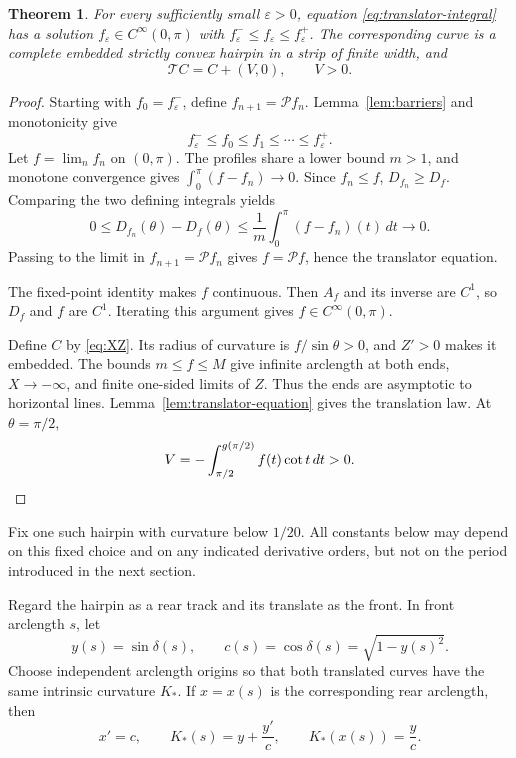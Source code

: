 \documentclass[11pt]{article}
\numberwithin{equation}{section}
\newtheorem{theorem}{Theorem}[section]
\newcommand{\Tmap}{\mathcal T}
\newcommand{\eps}{\varepsilon}
\begin{document}
\begin{theorem}\label{thm:hairpin}
For every sufficiently small \(\eps>0\), equation
\eqref{eq:translator-integral} has a solution \(f_\eps\in C^\infty(0,\pi)\)
with \(f_\eps^-\leq f_\eps\leq f_\eps^+\). The corresponding curve is a
complete embedded strictly convex hairpin in a strip of finite width, and
\[
  \Tmap C=C+(V,0),\qquad V>0.
\]
\end{theorem}

\begin{proof}
Starting with \(f_0=f_\eps^-\), define \(f_{n+1}=\mathcal P f_n\).
Lemma~\ref{lem:barriers} and monotonicity give
\[
  f_\eps^-\leq f_0\leq f_1\leq\cdots\leq f_\eps^+.
\]
Let \(f=\lim_n f_n\) on \((0,\pi)\). The profiles share a lower bound
\(m>1\), and monotone convergence gives
\(\int_0^\pi(f-f_n)\to0\). Since \(f_n\leq f\),
\(D_{f_n}\geq D_f\). Comparing the two defining integrals yields
\[
  0\leq D_{f_n}(\theta)-D_f(\theta)
  \leq\frac1m\int_0^\pi(f-f_n)(t)\,dt\longrightarrow0.
\]
Passing to the limit in \(f_{n+1}=\mathcal P f_n\) gives
\(f=\mathcal P f\), hence the translator equation.

The fixed-point identity makes \(f\) continuous. Then \(A_f\) and its
inverse are \(C^1\), so \(D_f\) and \(f\) are \(C^1\). Iterating this
argument gives \(f\in C^\infty(0,\pi)\).

Define \(C\) by \eqref{eq:XZ}. Its radius of curvature is
\(f/\sin\theta>0\), and \(Z'>0\) makes it embedded. The bounds
\(m\leq f\leq M\) give infinite arclength at both ends, \(X\to-\infty\),
and finite one-sided limits of \(Z\). Thus the ends are asymptotic to
horizontal lines. Lemma~\ref{lem:translator-equation} gives the translation
law. At \(\theta=\pi/2\),
\[
  V=-\int_{\pi/2}^{g(\pi/2)}f(t)\cot t\,dt>0.
  \qedhere
\]
\end{proof}

Fix one such hairpin with curvature below \(1/20\). All constants below may
depend on this fixed choice and on any indicated derivative orders, but not
on the period introduced in the next section.

Regard the hairpin as a rear track and its translate as the front. In front
arclength \(s\), let
\begin{equation}\label{eq:yc}
  y(s)=\sin\delta(s),\qquad c(s)=\cos\delta(s)=\sqrt{1-y(s)^2}.
\end{equation}
Choose independent arclength origins so that both translated curves have the
same intrinsic curvature \(K_*\). If \(x=x(s)\) is the corresponding rear
arclength, then
\begin{equation}\label{eq:isolated}
  x'=c,\qquad K_*(s)=y+\frac{y'}c,\qquad K_*(x(s))=\frac yc.
\end{equation}
\end{document}
